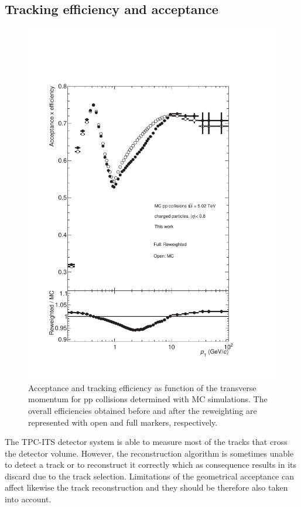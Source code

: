 \documentclass[12pt,a4paper]{report}
\begin{document}
\subsection{Tracking efficiency and acceptance}
\begin{figure}[tb!]
\centering
\includegraphics[width=12cm]{Plots/trckEffpp.pdf}  
\caption{Acceptance and tracking efficiency as function of the transverse momentum for pp collisions determined with MC simulations. The overall efficiencies obtained before and after the reweighting are represented with open and full markers, respectively.}
\label{trckEffpp}
\end{figure}
The TPC-ITS detector system is able to measure most of the tracks that cross the detector volume. However, the reconstruction algorithm is sometimes unable to detect a track or to reconstruct it correctly which as consequence results in its discard due to the track selection. Limitations of the geometrical acceptance can affect likewise the track reconstruction and they should be therefore also taken into account. \\
\end{document}
